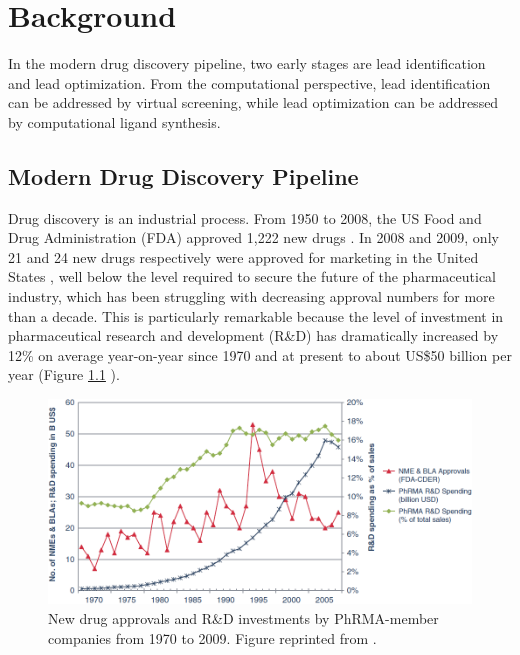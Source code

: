 \chapter{Background}

In the modern drug discovery pipeline, two early stages are lead identification and lead optimization. From the computational perspective, lead identification can be addressed by virtual screening, while lead optimization can be addressed by computational ligand synthesis.

\section{Modern Drug Discovery Pipeline}


Drug discovery is an industrial process. From 1950 to 2008, the US Food and Drug Administration (FDA) approved 1,222 new drugs \citep{717}. In 2008 and 2009, only 21 and 24 new drugs respectively were approved for marketing in the United States \citep{716}, well below the level required to secure the future of the pharmaceutical industry, which has been struggling with decreasing approval numbers for more than a decade. This is particularly remarkable because the level of investment in pharmaceutical research and development (R\&D) has dramatically increased by 12\% on average year-on-year since 1970 and at present to about US\$50 billion per year (Figure \ref{fig:NewDrugApprovals} \citep{686}).

\begin{figure}
\centering
\includegraphics[width=\textwidth]{Background/NewDrugApprovals.png}
\caption{New drug approvals and R\&D investments by PhRMA-member companies from 1970 to 2009. Figure reprinted from \citep{686}.}
\label{fig:NewDrugApprovals}
\end{figure}

